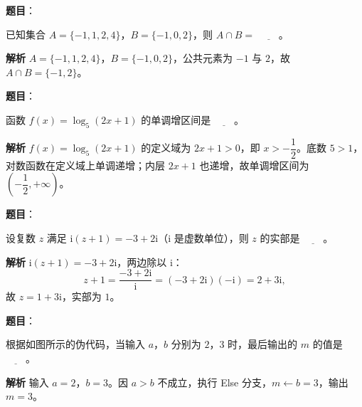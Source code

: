 
\begin{answer}

\textbf{题目}：

已知集合 $A=\{-1,1,2,4\}$，$B=\{-1,0,2\}$，则 $A\cap B=$ $\underline{\qquad}$。

\textbf{解析}
$A=\{-1,1,2,4\}$，$B=\{-1,0,2\}$，公共元素为 $-1$ 与 $2$，故 $A\cap B=\{-1,2\}$。


\end{answer}
\begin{answer}

\textbf{题目}：

函数 $f(x)=\log_5(2x+1)$ 的单调增区间是 $\underline{\qquad}$。

\textbf{解析}
$f(x)=\log_5(2x+1)$ 的定义域为 $2x+1>0$，即 $x>-\dfrac12$。底数 $5>1$，对数函数在定义域上单调递增；内层 $2x+1$ 也递增，故单调增区间为 $\left(-\dfrac12,+\infty\right)$。


\end{answer}
\begin{answer}

\textbf{题目}：

设复数 $z$ 满足 $\mathrm i(z+1)=-3+2\mathrm i$（$\mathrm i$ 是虚数单位），则 $z$ 的实部是 $\underline{\qquad}$。

\textbf{解析}
$\mathrm i(z+1)=-3+2\mathrm i$，两边除以 $\mathrm i$：
\nopagebreak[4]
\[z+1=\frac{-3+2\mathrm i}{\mathrm i}=(-3+2\mathrm i)(-\mathrm i)=2+3\mathrm i,\]
故 $z=1+3\mathrm i$，实部为 $1$。


\end{answer}
\begin{answer}

\textbf{题目}：

根据如图所示的伪代码，当输入 $a$，$b$ 分别为 $2$，$3$ 时，最后输出的 $m$ 的值是 $\underline{\qquad}$。
\nopagebreak[4]
\begin{center}\end{center}
\nopagebreak[4]
\textbf{解析}
输入 $a=2$，$b=3$。因 $a>b$ 不成立，执行 Else 分支，$m\leftarrow b=3$，输出 $m=3$。


\end{answer}
